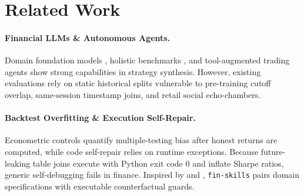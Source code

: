 \section{Related Work}
\label{sec:related}

\paragraph{Financial LLMs \& Autonomous Agents.}
Domain foundation models \citep{wu2023bloomberggpt,yang2023fingpt}, holistic benchmarks \citep{xie2024finben,li2024investorbench}, and tool-augmented trading agents \citep{yu2024finmem,zhang2024finagent} show strong capabilities in strategy synthesis. However, existing evaluations rely on static historical splits vulnerable to pre-training cutoff overlap, same-session timestamp joins, and retail social echo-chambers.

\paragraph{Backtest Overfitting \& Execution Self-Repair.}
Econometric controls \citep{white2000reality,hansen2005spa,bailey2014deflated,bailey2017pbo} quantify multiple-testing bias after honest returns are computed, while code self-repair \citep{shinn2023reflexion,chen2023selfdebug} relies on runtime exceptions. Because future-leaking table joins execute with Python exit code $0$ and inflate Sharpe ratios, generic self-debugging fails in finance. Inspired by \citet{ribeiro2020checklist} and \citet{zhao2019pyod}, \texttt{fin-skills} pairs domain specifications with executable counterfactual guards.
